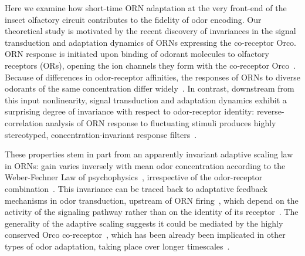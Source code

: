 \documentclass[9pt,lineno]{elife}
\begin{document}
Here we examine how short-time ORN adaptation at the very front-end of the insect olfactory circuit contributes to the fidelity of odor encoding. Our theoretical study is motivated by the recent discovery of invariances in the signal transduction and adaptation dynamics of ORNs expressing the co-receptor Orco. %
ORN response is initiated upon binding of odorant molecules to olfactory receptors (ORs), opening the ion channels they form with the co-receptor Orco~\citep{Orco, orco_structure}. Because of differences in odor-receptor affinities, the responses of ORNs to diverse odorants of the same concentration differ widely~\citep{hallem_carlson,montague2011similar,geosmin}. In contrast, downstream from this input nonlinearity, signal transduction and adaptation dynamics exhibit a surprising degree of invariance with respect to odor-receptor identity: reverse-correlation analysis of ORN response to fluctuating stimuli produces highly stereotyped, concentration-invariant response filters~\citep{martelli,si2017invariances, srinivas_elife}.

These properties stem in part from an apparently invariant adaptive scaling law in ORNs: gain varies inversely with mean odor concentration according to the Weber-Fechner Law of psychophysics~\citep{weber1996eh,fechner2012elemente}, irrespective of the odor-receptor combination~\citep{srinivas_elife,cafaro_WL,cao_WL}. This invariance can be traced back to adaptative feedback mechanisms in odor transduction, upstream of ORN firing~\citep{nagel_wilson_biophysical,cao_WL,cafaro_WL,srinivas_elife}, which depend on the activity of the signaling pathway rather than on the identity of its receptor~\citep{nagel_wilson_biophysical}. 
The generality of the adaptive scaling suggests it could be mediated by the highly conserved Orco co-receptor~\citep{orco_structure,getahun2013insect,getahun2016intracellular,Guo_Smith}, which has been already been implicated in other types of odor adaptation, taking place over longer timescales~\citep{Guo_Smith_review,Guo_Smith}. 
\end{document}
